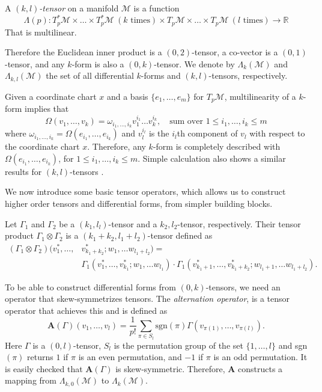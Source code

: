 \begin{definition}
A \emph{$(k,l)$-tensor} on a manifold $\mathcal M$ is a function 
\[
	\Lambda(p):T_p^*\mathcal M \times \dots \times T_p^*\mathcal M \ (k \text{ times}) \times T_p\mathcal M \times \dots \times T_p\mathcal M \ (l \text{ times}) \to \mathbb R
\]
That is multilinear.
\end{definition}
Therefore the Euclidean inner product is a $(0,2)$-tensor, a co-vector is a $(0,1)$-tensor, and any $k$-form is also a $(0,k)$-tensor. We denote by $\Lambda_{k}(\mathcal M)$ and $\Lambda_{k,l}(\mathcal M)$ the set of all differential $k$-forms and $(k,l)$-tensors, respectively.

Given a coordinate chart $x$ and a basis $\{ e_1,\dots,e_m\}$ for $T_{p}\mathcal M$, multilinearity of a $k$-form implies that
\begin{equation} \label{eq:2.6}
	\Omega(v_1,\dots,v_k) = \omega_{i_1,\dots,i_k} v_{1}^{i_1}\dots v_{k}^{i_k}, \quad \text{sum over }1 \leq i_1,\dots,i_k \leq m
\end{equation}
where $\omega_{i_1,\dots,i_k} = \Omega(e_{i_1},\dots,e_{i_k})$ and $v_{l}^{i_l}$ is the $i_l$th component of $v_l$ with respect to the coordinate chart $x$. Therefore, any $k$-form is completely described with $\Omega(e_{i_1},\dots,e_{i_k})$, for $1 \leq i_1,\dots,i_k \leq m$. Simple calculation also shows a similar results for $(k,l)$-tensors \cite{Wald:106274}.

We now introduce some basic tensor operators, which allows us to construct higher order tensors and differential forms, from simpler building blocks.
\begin{definition}
	Let $\Gamma_1$ and $\Gamma_2$ be a $(k_1,l_l)$-tensor and a $k_2,l_2$-tensor, respectively. Their tensor product $\Gamma_1\otimes \Gamma_2$ is a $(k_1+k_2,l_1+l_2)$-tensor defined as
\[
	\begin{aligned}
	(\Gamma_1\otimes \Gamma_2)(v^*_1,\dots,&v^*_{k_1+k_2};w_1,\dots w_{l_1+l_2}) = \\
		&\Gamma_1(v^*_1,\dots,v^*_{k_1};w_1,\dots w_{l_1})\cdot \Gamma_1(v^*_{k_1+1},\dots,v^*_{k_1+k_2};w_{l_1+1},\dots w_{l_1+l_2}).
	\end{aligned}
\]
\end{definition}
To be able to construct differential forms from $(0,k)$-tensors, we need an operator that skew-symmetrizes tensors. The \emph{alternation operator}, is a tensor operator that achieves this and is defined as
\begin{equation} \label{eq:2.7}
	\textbf{A}(\Gamma)(v_1,\dots,v_l) = \frac{1}{p!} \sum_{\pi \in S_l} \text{sgn}(\pi) \Gamma(v_{\pi(1)},\dots,v_{\pi(l)}).
\end{equation}
Here $\Gamma$ is a $(0,l)$-tensor, $S_l$ is the permutation group of the set $\{1,\dots,l\}$ and sgn$(\pi)$ returns $1$ if $\pi$ is an even permutation, and $-1$ if $\pi$ is an odd permutation. It is easily checked that $\textbf{A}(\Gamma)$ is skew-symmetric. Therefore, $\textbf{A}$ constructs a mapping from $\Lambda_{k,0}(\mathcal M)$ to $\Lambda_{k}(\mathcal M)$.

